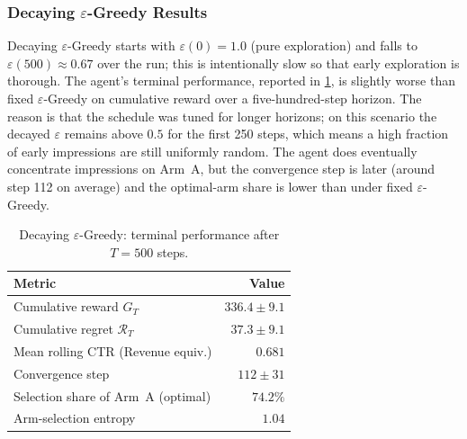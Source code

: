 \subsubsection{Decaying $\varepsilon$-Greedy Results}
Decaying $\varepsilon$-Greedy starts with $\varepsilon(0) = 1.0$ (pure exploration) and falls to $\varepsilon(500) \approx 0.67$ over the run; this is intentionally slow so that early exploration is thorough. The agent's terminal performance, reported in \cref{tab:res-egd}, is slightly worse than fixed $\varepsilon$-Greedy on cumulative reward over a five-hundred-step horizon. The reason is that the schedule was tuned for longer horizons; on this scenario the decayed $\varepsilon$ remains above $0.5$ for the first 250 steps, which means a high fraction of early impressions are still uniformly random. The agent does eventually concentrate impressions on Arm~A, but the convergence step is later (around step 112 on average) and the optimal-arm share is lower than under fixed $\varepsilon$-Greedy.

\begin{table}[H]
\centering
\caption{Decaying $\varepsilon$-Greedy: terminal performance after $T = 500$ steps.}
\label{tab:res-egd}
\small
\begin{tabular}{lr}
\toprule
\textbf{Metric} & \textbf{Value}\\
\midrule
Cumulative reward $G_T$              & $336.4 \pm 9.1$\\
Cumulative regret $\mathcal{R}_T$    & $37.3 \pm 9.1$\\
Mean rolling CTR (Revenue equiv.)    & $0.681$\\
Convergence step                     & $112 \pm 31$\\
Selection share of Arm~A (optimal)   & $74.2\%$\\
Arm-selection entropy                & $1.04$\\
\bottomrule
\end{tabular}
\end{table}


